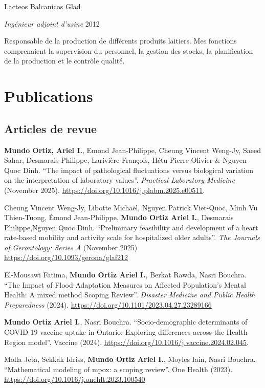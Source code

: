 \documentclass[10pt,]{article}
\providecommand{\tightlist}{%
  \setlength{\itemsep}{0pt}\setlength{\parskip}{0pt}}
\renewenvironment{itemize}{
  \begin{list}{}{
    \setlength{\leftmargin}{1.5em}
  }
}{
  \end{list}
}
\begin{document}
Lacteos Balcanicos Glad

\emph{Ingénieur adjoint d'usine} \hfill 2012

\begin{itemize}
\tightlist
\item
  Responsable de la production de différents produits laitiers. Mes
  fonctions comprenaient la supervision du personnel, la gestion des
  stocks, la planification de la production et le contrôle qualité.
\end{itemize}

\section{Publications}\label{publications}

\subsection{Articles de revue}\label{articles-de-revue}

\textbf{Mundo Ortiz, Ariel I.}, Emond Jean-Philippe, Cheung Vincent
Weng-Jy, Saeed Sahar, Desmarais Philippe, Larivière François, Hétu
Pierre-Olivier \& Nguyen Quoc Dinh. ``The impact of pathological
fluctuations versus biological variation on the interpretation of
laboratory values''. \emph{Practical Laboratory Medicine} (November
2025). \url{https://doi.org/10.1016/j.plabm.2025.e00511}.

Cheung Vincent Weng-Jy, Libotte Michaël, Nguyen Patrick Viet-Quoc, Minh
Vu Thien-Tuong, Émond Jean-Philippe, \textbf{Mundo Ortiz Ariel I.},
Desmarais Philippe,Nguyen Quoc Dinh. ``Preliminary feasibility and
development of a heart rate-based mobility and activity scale for
hospitalized older adults''. \emph{The Journals of Gerontology: Series
A} (November 2025) \url{https://doi.org/10.1093/gerona/glaf212}

El-Mousawi Fatima, \textbf{Mundo Ortiz Ariel I.}, Berkat Rawda, Nasri
Bouchra. ``The Impact of Flood Adaptation Measures on Affected
Population's Mental Health: A mixed method Scoping Review''.
\emph{Disaster Medicine and Public Health Preparedness} (2024).
\url{https://doi.org/10.1101/2023.04.27.23289166}

\textbf{Mundo Ortiz Ariel I.}, Nasri Bouchra. ``Socio-demographic
determinants of COVID-19 vaccine uptake in Ontario: Exploring
differences across the Health Region model''. Vaccine (2024).
\url{https://doi.org/10.1016/j.vaccine.2024.02.045}.

Molla Jeta, Sekkak Idriss, \textbf{Mundo Ortiz Ariel I.}, Moyles Iain,
Nasri Bouchra. ``Mathematical modeling of mpox: a scoping review''. One
Health (2023). \url{https://doi.org/10.1016/j.onehlt.2023.100540}
\end{document}

